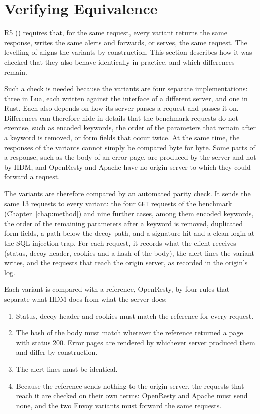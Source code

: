 \documentclass{rptuma}
\begin{document}
\section{Verifying Equivalence}
\label{sec:impl.parity}

R5 () requires that, for the same request, every variant returns the same
response, writes the same alerts and forwards, or serves, the same request. The levelling of
 aligns the variants by construction. This section describes how it was
checked that they also behave identically in practice, and which differences remain.

Such a check is needed because the variants are four separate implementations: three in Lua, each
written against the interface of a different server, and one in Rust. Each also depends on how
its server parses a request and passes it on. Differences can therefore hide in details that
the benchmark requests do not exercise, such as encoded keywords, the order of the parameters that
remain after a keyword is removed, or form fields that occur twice. At the same time, the responses
of the variants cannot simply be compared byte for byte. Some parts of a response, such as the body
of an error page, are produced by the server and not by HDM, and OpenResty and Apache have no
origin server to which they could forward a request.

The variants are therefore compared by an automated parity check. It sends the same 13 requests to
every variant: the four \texttt{GET} requests of the benchmark (Chapter~\ref{chap:method}) and nine
further cases, among them encoded keywords, the order of the remaining parameters after a keyword is
removed, duplicated form fields, a path below the decoy path, and a signature hit and a clean login
at the SQL-injection trap. For each request, it records what the client
receives (status, decoy header, cookies and a hash of the body), the alert lines the variant writes,
and the requests that reach the origin server, as recorded in the origin's log.

Each variant is compared with a reference, OpenResty, by four rules that separate what
HDM does from what the server does:
\begin{enumerate}
  \item Status, decoy header and cookies must match the reference for every request.
  \item The hash of the body must match wherever the reference returned a page with status 200.
    Error pages are rendered by whichever server produced them and differ by construction.
  \item The alert lines must be identical.
  \item Because the reference sends nothing to the origin server, the requests that reach it are
    checked on their own terms: OpenResty and Apache must send none, and the two Envoy variants
    must forward the same requests.
\end{enumerate}
\end{document}
